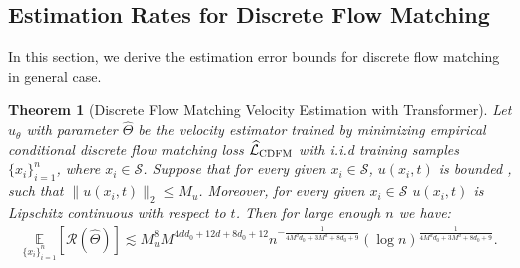 \documentclass[12pt]{article}
\numberwithin{equation}{section}
\let\hat\widehat
\newcommand{\wh}{\widehat}
\renewcommand{\hat}{\wh}
\DeclareMathOperator*{\E}{{\mathbb{E}}}
\def\E{\mathbb{E}}
\theoremstyle{theoremstyle}
\newtheorem{theorem}{Theorem}[section]
\numberwithin{equation}{section}
\numberwithin{theorem}{section}
\numberwithin{proposition}{section}
\numberwithin{definition}{section}
\numberwithin{lemma}{section}
\numberwithin{assumption}{section}
\numberwithin{remark}{section}
\begin{document}
\subsection{Estimation Rates for Discrete Flow Matching}

In this section, we derive the estimation error bounds for discrete flow matching in general case.

\begin{theorem}[Discrete Flow Matching Velocity Estimation with Transformer]
\label{thm:main_proof_velocity_estimation_general}
Let $\hat{u}_\theta$ with parameter $\hat{\Theta}$ be the velocity estimator trained by minimizing empirical conditional discrete flow matching loss $\hat{\mathcal{L}}_{\rm CDFM}$ with i.i.d training samples $\{x_i\}_{i=1}^n$, where $x_i\in \mathcal{S}$.
Suppose that for every given $x_i\in \mathcal{S}$, $u(x_i,t)$ is bounded , such that $\|u(x_i,t)\|_2\leq M_u$.
Moreover, for every given $x_i\in \mathcal{S}$ $u(x_i,t)$ is Lipschitz continuous with respect to $t$.
Then for large enough $n$ we have:
\begin{align*}
    \underset{\{x_i\}_{i=1}^n}{\E}[\mathcal{R}(\hat{\Theta})]\lesssim  M_u^8M^{4dd_0+12d+8d_0+12}n^{-\frac{ 1}{4M^dd_0+3M^d+8d_0+9}}(\log n)^{\frac{1}{4M^dd_0+3M^d+8d_0+9}}.
\end{align*}
\end{theorem}
\end{document}
